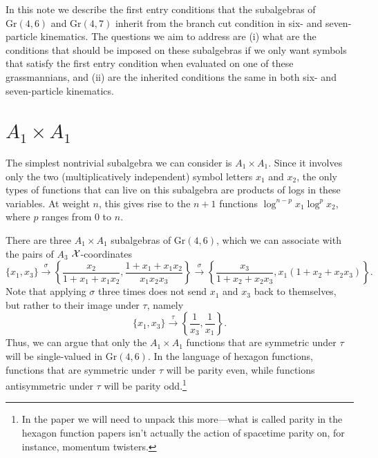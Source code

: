 \documentclass[12pt]{article}
\begin{document}
\thispagestyle{fancyplain}
 
\fancyhf{}
 
\cfoot{\fancyplain{}{\thepage}}


\noindent In this note we describe the first entry conditions that the subalgebras of $\text{Gr}(4,6)$ and $\text{Gr}(4,7)$ inherit from the branch cut condition in six- and seven-particle kinematics. The questions we aim to address are (i) what are the conditions that should be imposed on these subalgebras if we only want symbols that satisfy the first entry condition when evaluated on one of these grassmannians, and (ii) are the inherited conditions the same in both six- and seven-particle kinematics. 

\section*{$A_1 \times A_1$}
The simplest nontrivial subalgebra we can consider is $A_1 \times A_1$. Since it involves only the two (multiplicatively independent) symbol letters $x_1$ and $x_2$, the only types of functions that can live on this subalgebra are products of logs in these variables. At weight $n$, this gives rise to the $n+1$ functions $\log^{n-p} x_1 \log^{p} x_2$, where $p$ ranges from 0 to $n$. 

There are three $A_1 \times A_1$ subalgebras of $\text{Gr}(4,6)$, which we can associate with the pairs of $A_3$ ${\cal X}$-coordinates 
$$\{ x_1, x_3 \} \xrightarrow{\sigma} \left \{ \frac{x_2}{1 + x_1 + x_1 x_2}, \frac{1 + x_1 + x_1 x_2}{x_1 x_2 x_3} \right \} \xrightarrow{\sigma} \left \{ \frac{x_3}{1 + x_2 + x_2 x_3}, x_1 (1 + x_2 + x_2 x_3) \right \}. $$
Note that applying $\sigma$ three times does not send $x_1$ and $x_3$ back to themselves, but rather to their image under $\tau$, namely 
$$\{ x_1, x_3 \} \xrightarrow{\tau} \left \{ \frac{1}{x_3}, \frac{1}{x_1} \right \}. $$
Thus, we can argue that only the $A_1 \times A_1$ functions that are symmetric under $\tau$ will be single-valued in $\text{Gr}(4,6)$. In the language of hexagon functions, functions that are symmetric under $\tau$ will be parity even, while functions antisymmetric under $\tau$ will be parity odd.\footnote{In the paper we will need to unpack this more---what is called parity in the hexagon function papers isn't actually the action of spacetime parity on, for instance, momentum twisters.}
\end{document}
